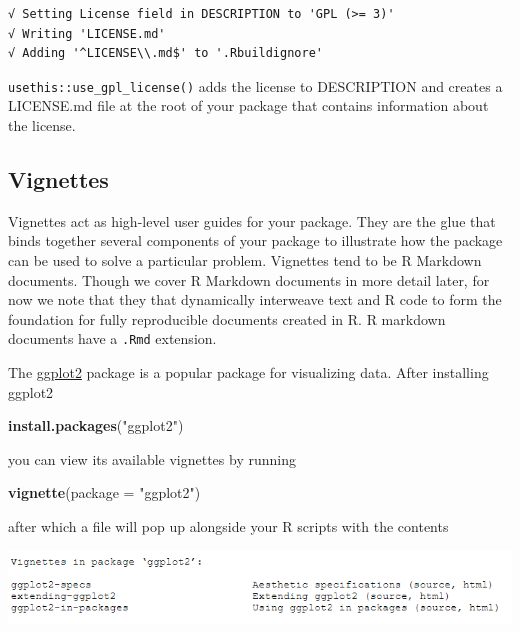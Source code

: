 \documentclass[
]{book}
\newenvironment{Shaded}{\begin{snugshade}}{\end{snugshade}}
\newcommand{\DataTypeTok}[1]{\textcolor[rgb]{0.13,0.29,0.53}{#1}}
\newcommand{\KeywordTok}[1]{\textcolor[rgb]{0.13,0.29,0.53}{\textbf{#1}}}
\newcommand{\NormalTok}[1]{#1}
\newcommand{\StringTok}[1]{\textcolor[rgb]{0.31,0.60,0.02}{#1}}
\begin{document}
\begin{verbatim}
√ Setting License field in DESCRIPTION to 'GPL (>= 3)'
√ Writing 'LICENSE.md'
√ Adding '^LICENSE\\.md$' to '.Rbuildignore'
\end{verbatim}

\texttt{usethis::use\_gpl\_license()} adds the license to DESCRIPTION and creates a LICENSE.md file at the root of your package that contains information about the license.

\hypertarget{vignettes}{%
\subsection{Vignettes}\label{vignettes}}

Vignettes act as high-level user guides for your package. They are the glue that binds together several components of your package to illustrate how the package can be used to solve a particular problem. Vignettes tend to be \protect\hypertarget{rmarkdown}{}{R Markdown} documents. Though we cover R Markdown documents in more detail later, for now we note that they that dynamically interweave text and R code to form the foundation for fully reproducible documents created in R. R markdown documents have a \texttt{.Rmd} extension.

The \href{https://ggplot2.tidyverse.org/}{ggplot2} package is a popular package for visualizing data. After installing ggplot2

\begin{Shaded}
\begin{Highlighting}[]
\KeywordTok{install.packages}\NormalTok{(}\StringTok{"ggplot2"}\NormalTok{)}
\end{Highlighting}
\end{Shaded}

you can view its available vignettes by running

\begin{Shaded}
\begin{Highlighting}[]
\KeywordTok{vignette}\NormalTok{(}\DataTypeTok{package =} \StringTok{"ggplot2"}\NormalTok{)}
\end{Highlighting}
\end{Shaded}

after which a file will pop up alongside your R scripts with the contents

\includegraphics[width=1\linewidth]{images/newrpack_files6}
\end{document}
